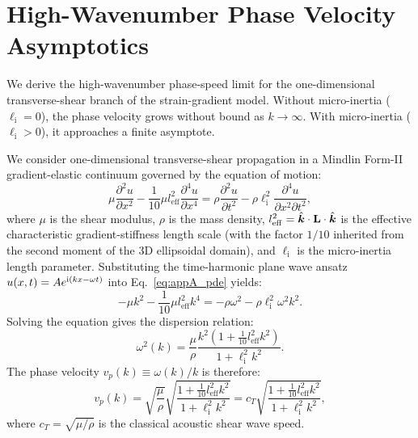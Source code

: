 \section{High-Wavenumber Phase Velocity Asymptotics}
\label{app:asymptotics}

We derive the high-wavenumber phase-speed limit for the one-dimensional transverse-shear branch of the strain-gradient model. Without micro-inertia ($\ell_{\mathrm{i}}=0$), the phase velocity grows without bound as $k\to\infty$. With micro-inertia ($\ell_{\mathrm{i}}>0$), it approaches a finite asymptote.

We consider one-dimensional transverse-shear propagation in a Mindlin Form-II gradient-elastic continuum governed by the equation of motion:
\begin{equation}
\mu \frac{\partial^2 u}{\partial x^2} - \frac{1}{10} \mu l_{\mathrm{eff}}^2 \frac{\partial^4 u}{\partial x^4} = \rho \frac{\partial^2 u}{\partial t^2} - \rho \ell_{\mathrm{i}}^2 \frac{\partial^4 u}{\partial x^2 \partial t^2},
\label{eq:appA_pde}
\end{equation}
where $\mu$ is the shear modulus, $\rho$ is the mass density, $l_{\mathrm{eff}}^2 = \hat{\bm{k}}\cdot\mathbf{L}\cdot\hat{\bm{k}}$ is the effective characteristic gradient-stiffness length scale (with the factor $1/10$ inherited from the second moment of the 3D ellipsoidal domain), and $\ell_{\mathrm{i}}$ is the micro-inertia length parameter. Substituting the time-harmonic plane wave ansatz $u(x, t) = A e^{\mathrm{i}(k x - \omega t)}$ into Eq.~\eqref{eq:appA_pde} yields:
\begin{equation}
-\mu k^2 - \frac{1}{10} \mu l_{\mathrm{eff}}^2 k^4 = -\rho \omega^2 - \rho \ell_{\mathrm{i}}^2 \omega^2 k^2.
\label{eq:appA_char}
\end{equation}
Solving the equation gives the dispersion relation:
\begin{equation}
\omega^2(k) = \frac{\mu}{\rho} \frac{k^2 \left( 1 + \frac{1}{10} l_{\mathrm{eff}}^2 k^2 \right)}{1 + \ell_{\mathrm{i}}^2 k^2}.
\label{eq:appA_dispersion}
\end{equation}
The phase velocity $v_p(k) \equiv \omega(k)/k$ is therefore:
\begin{equation}
v_p(k) = \sqrt{\frac{\mu}{\rho}} \sqrt{\frac{1 + \frac{1}{10} l_{\mathrm{eff}}^2 k^2}{1 + \ell_{\mathrm{i}}^2 k^2}} = c_T \sqrt{\frac{1 + \frac{1}{10} l_{\mathrm{eff}}^2 k^2}{1 + \ell_{\mathrm{i}}^2 k^2}},
\label{eq:appA_vp}
\end{equation}
where $c_T = \sqrt{\mu/\rho}$ is the classical acoustic shear wave speed.

